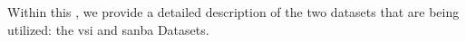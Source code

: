 \label{datasets}

Within this \headerName{}, we provide a detailed description of the two datasets that are being utilized: the \gls{vsi} and \gls{sanba} Datasets.



